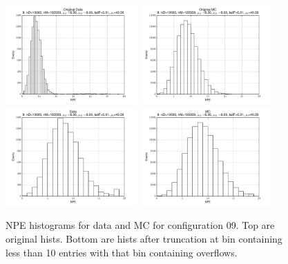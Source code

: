  \begin{figure}[htbp] \begin{center} 
\includegraphics[width=0.45\textwidth]{../FIGURES/09/FIG_Original_Data.pdf} 
\includegraphics[width=0.45\textwidth]{../FIGURES/09/FIG_Original_MC.pdf} 
\includegraphics[width=0.45\textwidth]{../FIGURES/09/FIG_Data.pdf} 
\includegraphics[width=0.45\textwidth]{../FIGURES/09/FIG_MC.pdf} 
\caption{NPE histograms for data and MC for configuration 09. Top are original hists. Bottom are hists after truncation at bin containing less than 10 entries with that bin containing overflows.} 
\label{tab:npe_09} 
\end{center} \end{figure} 

 